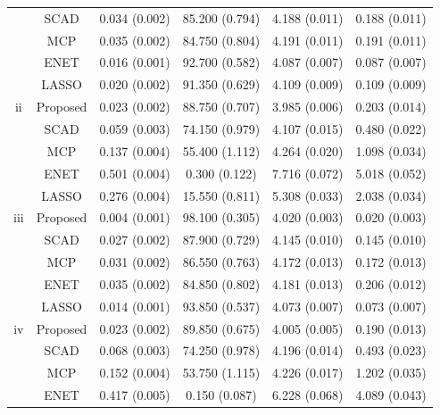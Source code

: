 \documentclass[twocolumn]{svjour3}       %
\newcommand{\0}{\boldsymbol 0} %
\newcommand{\1}{\boldsymbol 1} %
\begin{document}
{\begin{table}[H]
\begin{tabular}{cccccc}
           & SCAD                           & 0.034 (0.002)  & 85.200 (0.794)  & 4.188 (0.011)   & 0.188 (0.011) \\
           & MCP                            & 0.035 (0.002)  & 84.750 (0.804)  & 4.191 (0.011)   & 0.191 (0.011) \\
           & ENET                           & 0.016 (0.001)  & 92.700 (0.582)  & 4.087 (0.007)   & 0.087 (0.007) \\
           & LASSO                          & 0.020 (0.002)  & 91.350 (0.629)  & 4.109 (0.009)   & 0.109 (0.009) \\
  ii         & Proposed & 0.023 (0.002) & 88.750 (0.707) & 3.985 (0.006)  & 0.203 (0.014) \\
           & SCAD                           & 0.059 (0.003)  & 74.150 (0.979)  & 4.107 (0.015)   & 0.480 (0.022) \\
           & MCP                            & 0.137 (0.004)  & 55.400 (1.112)  & 4.264 (0.020)   & 1.098 (0.034) \\
           & ENET                           & 0.501 (0.004)  & 0.300 (0.122)   & 7.716 (0.072)   & 5.018 (0.052) \\
           & LASSO                          & 0.276 (0.004)  & 15.550 (0.811)  & 5.308 (0.033)   & 2.038 (0.034) \\
  iii         & Proposed & 0.004 (0.001)   & 98.100 (0.305)  & 4.020 (0.003)    & 0.020 (0.003) \\
           & SCAD                           & 0.027 (0.002)  & 87.900 (0.729)  & 4.145 (0.010)   & 0.145 (0.010) \\
           & MCP                            & 0.031 (0.002)  & 86.550 (0.763)  & 4.172 (0.013)   & 0.172 (0.013) \\
           & ENET                           & 0.035 (0.002)  & 84.850 (0.802)  & 4.181 (0.013)   & 0.206 (0.012) \\
           & LASSO                          & 0.014 (0.001)  & 93.850 (0.537)  & 4.073 (0.007)   & 0.073 (0.007) \\
   iv      & Proposed & 0.023 (0.002)   & 89.850 (0.675)  & 4.005 (0.005) & 0.190 (0.013) \\
           & SCAD                           & 0.068 (0.003)  & 74.250 (0.978)  & 4.196 (0.014)   & 0.493 (0.023) \\
           & MCP                            & 0.152 (0.004)  & 53.750 (1.115)  & 4.226 (0.017)   & 1.202 (0.035) \\
           & ENET                           & 0.417 (0.005)  & 0.150 (0.087)   & 6.228 (0.068)   & 4.089 (0.043) \\

\end{tabular}
\end{table}}
\end{document}
